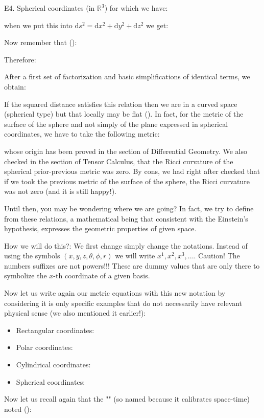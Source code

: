 	\pagebreak
	\begin{tcolorbox}[colframe=black,colback=white,sharp corners]	
	E4. Spherical coordinates (in $\mathbb{R}^3$) for which we have:
	
	when we put this into $\mathrm{d}s^2=\mathrm{d}x^2+\mathrm{d}y^2+\mathrm{d}z^2$ we get:
	
	Now remember that ():
	
	Therefore:
	
	After a first set of factorization and basic simplifications of identical terms, we obtain:
	
	If the squared  distance satisfies this relation then we are in a curved space (spherical type) but that locally may be flat (). In fact, for the metric of the surface of the sphere and not simply of the plane expressed in spherical coordinates, we have to take the following metric:
	
	whose origin has been proved in the section of Differential Geometry. We also checked in the section of Tensor Calculus, that the Ricci curvature of the spherical prior-previous metric was zero. By cons, we had right after checked that if we took the previous metric of the surface of the sphere, the Ricci curvature was not zero (and it is still happy!).
	\end{tcolorbox}
	Until then, you may be wondering where we are going? In fact, we try to define from these relations, a mathematical being that consistent with the Einstein's hypothesis, expresses the geometric properties of given space.
	
	How we will do this?: We first change simply change the notations. Instead of using the symbols $(x,y,z,\theta,\phi,r)$ we will write $x^1,x^2,x^3,...$. Caution! The numbers suffixes are not powers!!! These are dummy values that are only there to symbolize the $x$-th coordinate of a given basis.
	
	Now let us write again our metric equations with this new notation by considering it is only specific examples that do not necessarily have relevant physical sense (we also mentioned it earlier!):
	\begin{itemize}
		\item Rectangular coordinates:
		
		\item Polar coordinates:
		
		\item Cylindrical coordinates:
		
		\item Spherical coordinates:
		
	\end{itemize}
	Now let us recall again that the "" (so named because it calibrates space-time) noted ():
	
